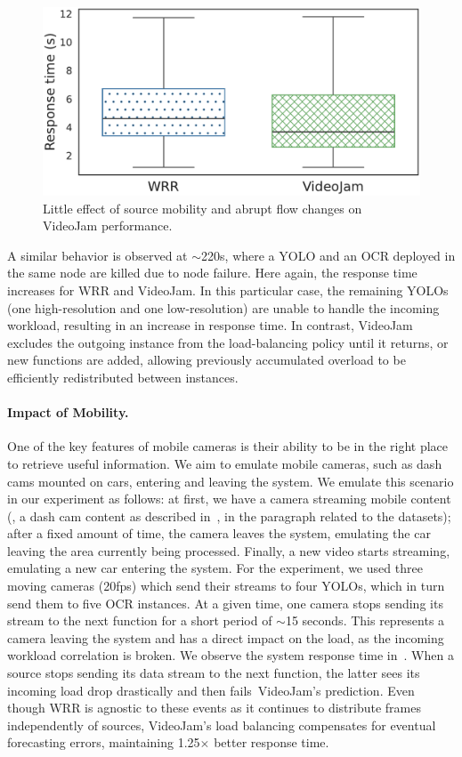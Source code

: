 \begin{figure}[t!]
	\centering
	\includegraphics[width=.6\linewidth]{chapters/videojam/images/impact_of_mobility/response_time.pdf}
	\caption{Little effect of source mobility and abrupt flow changes on VideoJam performance.}
	\label{fig:impact_mobility}
\end{figure}

A similar behavior is observed at $\sim$220s, where a YOLO and an OCR deployed in the same node are killed due to node failure. Here again, the response time increases for WRR and VideoJam. In this particular case, the remaining YOLOs (one high-resolution and one low-resolution) are unable to handle the incoming workload, resulting in an increase in response time. In contrast, VideoJam excludes the outgoing instance from the load-balancing policy until it returns, or new functions are added, allowing previously accumulated overload to be efficiently redistributed between instances.


\paragraph{Impact of Mobility.} One of the key features of mobile cameras is their ability to be in the right place to retrieve useful information. We aim to emulate mobile cameras, such as dash cams mounted on cars, entering and leaving the system. We emulate this scenario in our experiment as follows: at first, we have a camera streaming mobile content (\ie, a dash cam content as described in~, in the paragraph related to the datasets); after a fixed amount of time, the camera leaves the system, emulating the car leaving the area currently being processed. Finally, a new video starts streaming, emulating a new car entering the system. For the experiment, we used three moving cameras (20fps) which send their streams to four YOLOs, which in turn send them to five OCR instances. At a given time, one camera stops sending its stream to the next function for a short period of $\sim$15 seconds. This represents a camera leaving the system and has a direct impact on the load, as the incoming workload correlation is broken. We observe the system response time in~. When a source stops sending its data stream to the next function, the latter sees its incoming load drop drastically and then fails~VideoJam's prediction. Even though WRR is agnostic to these events as it continues to distribute frames independently of sources, VideoJam's load balancing compensates for eventual forecasting errors, maintaining 1.25$\times$ better response time.